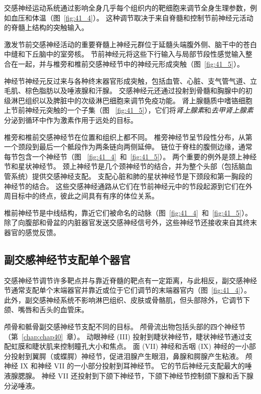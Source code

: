 交感神经运动系统通过影响全身几乎每个组织内的靶细胞来调节全身生理参数，例如血压和体温（图~\ref{fig:41_4}）。
这种调节取决于来自脊髓和控制节前神经元活动的脊髓上结构的突触输入。


激发节前交感神经活动的重要脊髓上神经元群位于延髓头端腹外侧、脑干中的苍白中缝和下丘脑中的室旁核。
节前神经元将这些下行输入与局部节段性感觉输入整合在一起，并与椎旁和椎前交感神经节中的神经元形成突触（图~\ref{fig:41_5}）。


神经节神经元反过来与各种终末器官形成突触，包括血管、心脏、支气管气道、立毛肌、棕色脂肪以及唾液腺和汗腺。
交感神经元还通过投射到骨髓和胸腺中的初级淋巴组织以及脾脏中的次级淋巴细胞来调节免疫功能。
肾上腺髓质中嗜铬细胞上节前神经元突触的一个子集（图 ~\ref{fig:41_5}），它们将\textit{肾上腺素}和\textit{去甲肾上腺素}分泌到循环中作为激素作用于远处的目标。


椎旁和椎前交感神经节在位置和组织上都不同。
椎旁神经节呈节段性分布，从第一个颈段到最后一个骶段作为两条链向两侧延伸。
链位于脊柱的腹侧边缘，通常每节包含一个神经节（图 ~\ref{fig:41_4}~和~\ref{fig:41_5}）。
两个重要的例外是颈上神经节和星状神经节。
颈上神经节是几个颈神经节的结合，并为整个头部（包括脑血管系统）提供交感神经支配。
支配心脏和肺的星状神经节是下颈段和第一胸段的神经节的结合。
这些交感神经通路从它们在节前神经元中的节段起源到它们在外周目标中的终点，彼此之间具有有序的体位关系。


椎前神经节是中线结构，靠近它们被命名的动脉（图~\ref{fig:41_4}~和~\ref{fig:41_5}）。
除了向腹部和骨盆的内脏器官发送交感神经信号外，这些神经节还接收来自其终末器官的感觉反馈。



\subsection{副交感神经节支配单个器官}

交感神经节调节许多靶点并与靠近脊髓的靶点有一定距离，与此相反，副交感神经节通常支配单个末端器官并靠近或位于它们调节的末端器官内（图~\ref{fig:41_4}）。
此外，副交感神经系统不影响淋巴组织、皮肤或骨骼肌，但头部除外，它调节下颌、嘴唇和舌头的血管床。


颅骨和骶骨副交感神经节支配不同的目标。
颅骨流出物包括头部的四个神经节（第~\ref{chap:chap40}~章）。
动眼神经 (III) 投射到睫状神经节，睫状神经节通过支配虹膜和睫状肌来控制瞳孔大小和焦点。
面 (VII) 神经和舌咽 (IX) 神经的一小部分投射到翼腭（或蝶腭）神经节，促进泪腺产生眼泪，鼻腺和腭腺产生粘液。
颅神经 IX 和神经 VII 的一小部分投射到耳神经节。 它的节后神经元支配最大的唾液腺腮腺。
神经 VII 还投射到下颌下神经节，下颌下神经节控制颌下腺和舌下腺分泌唾液。


